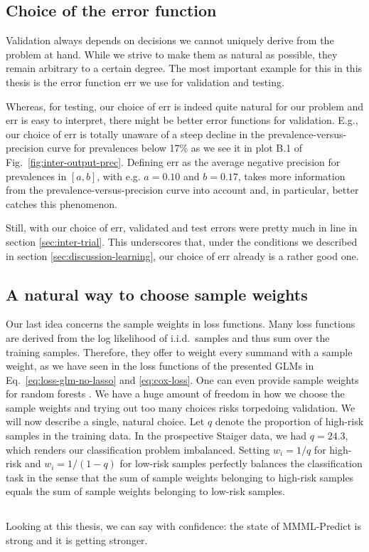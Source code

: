 \subsection{Choice of the error function}

Validation always depends on decisions we cannot uniquely derive from the problem at hand. 
While we strive to make them as natural as possible, they remain arbitrary to a certain degree. 
The most important example for this in this thesis is the error function $\text{err}$ we use for 
validation and testing.

Whereas, for testing, our choice of $\text{err}$ is indeed quite natural for our problem and 
$\text{err}$ is easy to interpret, there might be better error functions for validation. E.g., our 
choice of $\text{err}$ is totally unaware of a steep decline in the prevalence-versus-precision 
curve for prevalences below \num{17}\% as we see it in plot B.1 of Fig.\ \ref{fig:inter-output-prec}. 
Defining $\text{err}$ as the average negative precision for prevalences in $[a, b]$, with e.g. 
$a = \num{0.10}$ and $b = \num{0.17}$, takes more information from the prevalence-versus-precision 
curve into account and, in particular, better catches this phenomenon.

Still, with our choice of $\text{err}$, validated and test errors were pretty much in line in 
section \ref{sec:inter-trial}. This underscores that, under the conditions we described in 
section \ref{sec:discussion-learning}, our choice of $\text{err}$ already is a rather good one.

\subsection{A natural way to choose sample weights}

Our last idea concerns the sample weights in loss functions. Many loss functions are derived 
from the log likelihood of i.i.d.\ samples and thus sum over the training samples. Therefore, they 
offer to weight every summand with a sample weight, as we have seen in the loss functions of the 
presented GLMs in Eq.\ \eqref{eq:loss-glm-no-lasso} and \eqref{eq:cox-loss}. One can even provide 
sample weights for random forests \cite{ranger17}. We have a huge amount of 
freedom in how we choose the sample weights and trying out too many choices risks torpedoing 
validation. We will now describe a single, natural choice. Let $q$ denote the 
proportion of high-risk samples in the training data. In the prospective Staiger data, we had 
$q = \num{24.3}$, which renders our classification problem imbalanced. Setting $w_i = 1/q$ for 
high-risk and $w_i = 1/(1-q)$ for low-risk samples perfectly balances the classification task in 
the sense that the sum of sample weights belonging to high-risk samples equals the sum of sample 
weights belonging to low-risk samples.

\subsection*{}
Looking at this thesis, we can say with confidence: the state of MMML-Predict is strong and 
it is getting stronger.